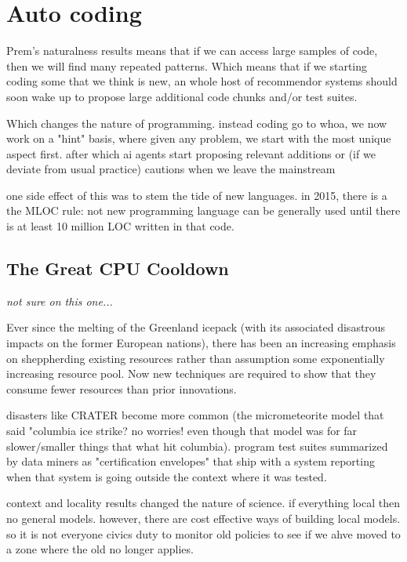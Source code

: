 \documentclass[journal]{IEEEtran}
\begin{document}
\section{Auto coding}

Prem's naturalness results means that if we can access large samples of code,
then we will find many repeated patterns. Which means that if we starting coding some that we think is new, an whole host of recommendor  systems should soon   wake up to propose large additional code chunks and/or test suites. 

Which changes the nature of programming. instead coding go to whoa, we now work on a "hint" basis, where given any problem, we start with the most unique aspect first. after which ai agents start proposing relevant additions or (if we deviate from usual practice) cautions when we leave the mainstream

one side effect of this was to stem the tide of new languages. in 2015, there is a the MLOC rule: not new programming language can be generally used until there is at least 10 million LOC written in that code.  

\subsection{The Great CPU Cooldown}

{\em not sure on this one...}

Ever since the melting of the Greenland icepack (with its associated disastrous impacts on the former European nations), there has been an increasing emphasis on sheppherding existing resources rather than assumption some exponentially increasing resource pool. Now new techniques are required to show that they consume fewer resources than prior innovations. 



disasters like CRATER become more common (the micrometeorite model that said "columbia ice strike? no worries! even though that model was for far slower/smaller things that what hit columbia). program test suites summarized by data miners as "certification envelopes" that ship with a system reporting when that system is going outside the context where it was tested.

context and locality results changed the nature of science. if everything local then no general models. however, there are cost effective ways of building local models. so it is not everyone civics duty to monitor old policies to see if we ahve moved to a zone where the old no longer applies.
\end{document}
